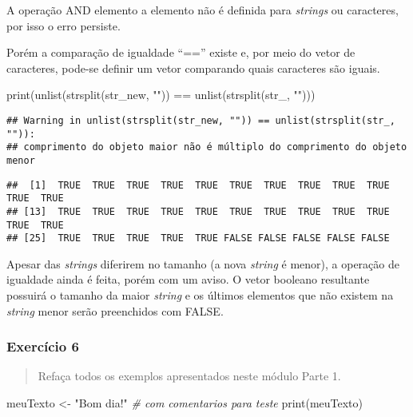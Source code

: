 \documentclass[
]{article}
\newenvironment{Shaded}{\begin{snugshade}}{\end{snugshade}}
\newcommand{\CommentTok}[1]{\textcolor[rgb]{0.56,0.35,0.01}{\textit{#1}}}
\newcommand{\FunctionTok}[1]{\textcolor[rgb]{0.00,0.00,0.00}{#1}}
\newcommand{\NormalTok}[1]{#1}
\newcommand{\OtherTok}[1]{\textcolor[rgb]{0.56,0.35,0.01}{#1}}
\newcommand{\SpecialCharTok}[1]{\textcolor[rgb]{0.00,0.00,0.00}{#1}}
\newcommand{\StringTok}[1]{\textcolor[rgb]{0.31,0.60,0.02}{#1}}
\begin{document}
A operação AND elemento a elemento não é definida para \emph{strings} ou
caracteres, por isso o erro persiste.

Porém a comparação de igualdade ``=='' existe e, por meio do vetor de
caracteres, pode-se definir um vetor comparando quais caracteres são
iguais.

\begin{Shaded}
\begin{Highlighting}[]
\FunctionTok{print}\NormalTok{(}\FunctionTok{unlist}\NormalTok{(}\FunctionTok{strsplit}\NormalTok{(str\_new, }\StringTok{""}\NormalTok{)) }\SpecialCharTok{==} \FunctionTok{unlist}\NormalTok{(}\FunctionTok{strsplit}\NormalTok{(str\_, }\StringTok{""}\NormalTok{)))}
\end{Highlighting}
\end{Shaded}

\begin{verbatim}
## Warning in unlist(strsplit(str_new, "")) == unlist(strsplit(str_, "")):
## comprimento do objeto maior não é múltiplo do comprimento do objeto menor
\end{verbatim}

\begin{verbatim}
##  [1]  TRUE  TRUE  TRUE  TRUE  TRUE  TRUE  TRUE  TRUE  TRUE  TRUE  TRUE  TRUE
## [13]  TRUE  TRUE  TRUE  TRUE  TRUE  TRUE  TRUE  TRUE  TRUE  TRUE  TRUE  TRUE
## [25]  TRUE  TRUE  TRUE  TRUE  TRUE FALSE FALSE FALSE FALSE FALSE
\end{verbatim}

Apesar das \emph{strings} diferirem no tamanho (a nova \emph{string} é
menor), a operação de igualdade ainda é feita, porém com um aviso. O
vetor booleano resultante possuirá o tamanho da maior \emph{string} e os
últimos elementos que não existem na \emph{string} menor serão
preenchidos com FALSE.

\hypertarget{exercuxedcio-6}{%
\subsubsection{Exercício 6}\label{exercuxedcio-6}}

\begin{quote}
Refaça todos os exemplos apresentados neste módulo Parte 1.
\end{quote}

\begin{Shaded}
\begin{Highlighting}[]
\NormalTok{meuTexto }\OtherTok{\textless{}{-}} \StringTok{"Bom dia!"} \CommentTok{\# com comentarios para teste}
\FunctionTok{print}\NormalTok{(meuTexto)}
\end{Highlighting}
\end{Shaded}
\end{document}
